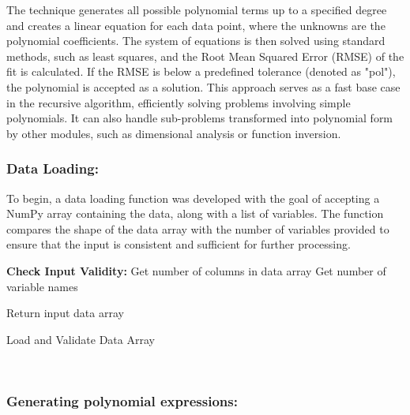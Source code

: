 \documentclass{article}
\begin{document}
The technique generates all possible polynomial terms up to a specified degree  and creates a linear equation for each data point, where the unknowns are the polynomial coefficients. The system of equations is then solved using standard methods, such as least squares, and the Root Mean Squared Error (RMSE) of the fit is calculated. If the RMSE is below a predefined tolerance (denoted as "pol"), the polynomial is accepted as a solution. This approach serves as a fast base case in the recursive algorithm, efficiently solving problems involving simple polynomials. It can also handle sub-problems transformed into polynomial form by other modules, such as dimensional analysis or function inversion.\\



\subsubsection{Data Loading:}

To begin, a data loading function was developed with the goal of accepting a NumPy array containing the data, along with a list of variables. The function compares the shape of the data array with the number of variables provided to ensure that the input is consistent and sufficient for further processing.\\




\begin{algorithm}[H]
\SetAlgoLined
{}

\textbf{Check Input Validity:}\;
Get number of columns in data array\;
Get number of variable names\;


Return input data array\;

\caption{Load and Validate Data Array}
\label{alg:load_data_array} %
\end{algorithm}\\





\subsubsection{Generating polynomial expressions:}
\end{document}

